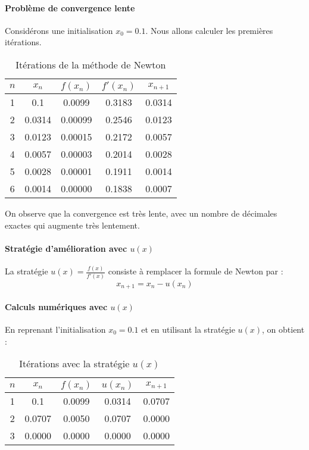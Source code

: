 \documentclass{article}
\begin{document}
\paragraph{Problème de convergence lente \\ }
Considérons une initialisation \( x_0 = 0.1 \). Nous allons calculer les premières itérations.

\begin{table}[h!]
\centering
\begin{tabular}{|c|c|c|c|c|}
\hline
$n$ & $x_n$ & $f(x_n)$ & $f'(x_n)$ & $x_{n+1}$ \\
\hline
1 & 0.1 & 0.0099 & 0.3183 & 0.0314 \\
2 & 0.0314 & 0.00099 & 0.2546 & 0.0123 \\
3 & 0.0123 & 0.00015 & 0.2172 & 0.0057 \\
4 & 0.0057 & 0.00003 & 0.2014 & 0.0028 \\
5 & 0.0028 & 0.00001 & 0.1911 & 0.0014 \\
6 & 0.0014 & 0.00000 & 0.1838 & 0.0007 \\
\hline
\end{tabular}
\caption{Itérations de la méthode de Newton}
\end{table}

On observe que la convergence est très lente, avec un nombre de décimales exactes qui augmente très lentement.

\paragraph{Stratégie d'amélioration avec \( u(x) \) \\ }
La stratégie \( u(x) = \frac{f(x)}{f'(x)} \) consiste à remplacer la formule de Newton par :
\[
x_{n+1} = x_n - u(x_n)
\]

\paragraph{Calculs numériques avec \( u(x) \) \\ }

En reprenant l'initialisation \( x_0 = 0.1 \) et en utilisant la stratégie \( u(x) \), on obtient :

\begin{table}[h!]
\centering
\begin{tabular}{|c|c|c|c|c|}
\hline
$n$ & $x_n$ & $f(x_n)$ & $u(x_n)$ & $x_{n+1}$ \\
\hline
1 & 0.1 & 0.0099 & 0.0314 & 0.0707 \\
2 & 0.0707 & 0.0050 & 0.0707 & 0.0000 \\
3 & 0.0000 & 0.0000 & 0.0000 & 0.0000 \\
\hline
\end{tabular}
\caption{Itérations avec la stratégie \( u(x) \)}
\end{table}
\end{document}
